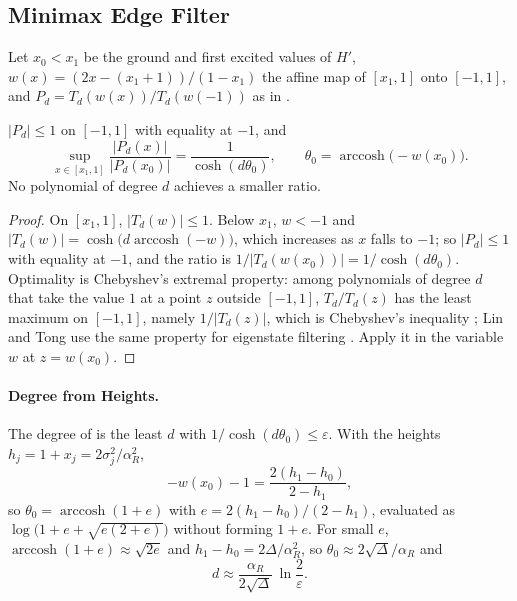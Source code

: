 \subsection{Minimax Edge Filter}
\label{app:minimax-filter}

Let $x_0<x_1$ be the ground and first excited values of $H'$, $w(x)=(2x-(x_1+1))/(1-x_1)$ the affine map of $[x_1,1]$ onto $[-1,1]$, and $P_d=T_d(w(x))/T_d(w(-1))$ as in .

\begin{proposition}
\label{prop:minimax-optimal}
$|P_d|\le1$ on $[-1,1]$ with equality at $-1$, and
\begin{equation*}
    \sup_{x\in[x_1,1]}\frac{|P_d(x)|}{|P_d(x_0)|}=\frac{1}{\cosh(d\theta_0)},
    \qquad\theta_0=\operatorname{arccosh}\bigl(-w(x_0)\bigr).
\end{equation*}
No polynomial of degree $d$ achieves a smaller ratio.
\end{proposition}
\begin{proof}
On $[x_1,1]$, $|T_d(w)|\le1$. Below $x_1$, $w<-1$ and $|T_d(w)|=\cosh\bigl(d\operatorname{arccosh}(-w)\bigr)$, which increases as $x$ falls to $-1$; so $|P_d|\le1$ with equality at $-1$, and the ratio is $1/|T_d(w(x_0))|=1/\cosh(d\theta_0)$. Optimality is Chebyshev's extremal property: among polynomials of degree $d$ that take the value $1$ at a point $z$ outside $[-1,1]$, $T_d/T_d(z)$ has the least maximum on $[-1,1]$, namely $1/|T_d(z)|$, which is Chebyshev's inequality \cite{borweinerdelyi1995}; Lin and Tong use the same property for eigenstate filtering \cite{lintong2020filtering}. Apply it in the variable $w$ at $z=w(x_0)$.
\end{proof}

\paragraph{Degree from Heights.} The degree of  is the least $d$ with $1/\cosh(d\theta_0)\le\varepsilon$. With the heights $h_j=1+x_j=2\sigma_j^2/\alpha_R^2$,
\begin{equation*}
    -w(x_0)-1=\frac{2(h_1-h_0)}{2-h_1},
\end{equation*}
so $\theta_0=\operatorname{arccosh}(1+e)$ with $e=2(h_1-h_0)/(2-h_1)$, evaluated as $\log\bigl(1+e+\sqrt{e(2+e)}\bigr)$ without forming $1+e$. For small $e$, $\operatorname{arccosh}(1+e)\approx\sqrt{2e}$ and $h_1-h_0=2\Delta/\alpha_R^2$, so $\theta_0\approx2\sqrt\Delta/\alpha_R$ and
\begin{equation}
    d\approx\frac{\alpha_R}{2\sqrt\Delta}\,\ln\frac2\varepsilon .
    \label{eq:app-minimax-growth}
\end{equation}

